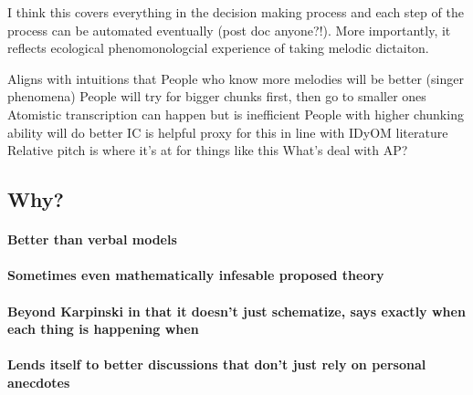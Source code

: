 \documentclass[]{book}
\let\oldparagraph\paragraph
\renewcommand{\paragraph}[1]{\oldparagraph{#1}\mbox{}}
\theoremstyle{definition}
\theoremstyle{definition}
\theoremstyle{definition}
\theoremstyle{remark}
\begin{document}
I think this covers everything in the decision making process and each
step of the process can be automated eventually (post doc anyone?!).
More importantly, it reflects ecological phenomonologcial experience of
taking melodic dictaiton.

Aligns with intuitions that People who know more melodies will be better
(singer phenomena) People will try for bigger chunks first, then go to
smaller ones Atomistic transcription can happen but is inefficient
People with higher chunking ability will do better IC is helpful proxy
for this in line with IDyOM literature Relative pitch is where it's at
for things like this What's deal with AP?

\hypertarget{why-1}{%
\subsection{Why?}\label{why-1}}

\hypertarget{better-than-verbal-models}{%
\paragraph{Better than verbal models}\label{better-than-verbal-models}}

\hypertarget{sometimes-even-mathematically-infesable-proposed-theory}{%
\paragraph{Sometimes even mathematically infesable proposed
theory}\label{sometimes-even-mathematically-infesable-proposed-theory}}

\hypertarget{beyond-karpinski-in-that-it-doesnt-just-schematize-says-exactly-when-each-thing-is-happening-when}{%
\paragraph{Beyond Karpinski in that it doesn't just schematize, says
exactly when each thing is happening
when}\label{beyond-karpinski-in-that-it-doesnt-just-schematize-says-exactly-when-each-thing-is-happening-when}}

\hypertarget{lends-itself-to-better-discussions-that-dont-just-rely-on-personal-anecdotes}{%
\paragraph{Lends itself to better discussions that don't just rely on
personal
anecdotes}\label{lends-itself-to-better-discussions-that-dont-just-rely-on-personal-anecdotes}}
\end{document}
